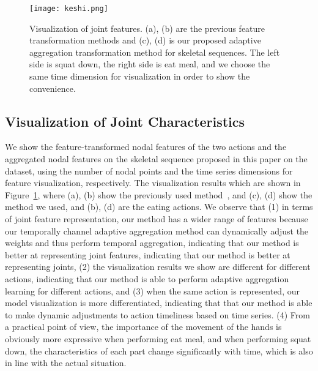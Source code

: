 \documentclass[letterpaper]{article} \usepackage[submission]{aaai23}  \usepackage{times}  \usepackage{helvet}  \usepackage{courier}  \usepackage[hyphens]{url}  \usepackage{graphicx} \urlstyle{rm} \def\UrlFont{\rm}  \usepackage{natbib}  \usepackage{caption} \frenchspacing  \setlength{\pdfpagewidth}{8.5in} \setlength{\pdfpageheight}{11in} \usepackage{algorithm}
\begin{document}
\begin{figure}[htp]
    \centering
    \texttt{[image: keshi.png]}
    \caption{Visualization of joint features. (a), (b) are the previous feature transformation methods and (c), (d) is our proposed adaptive aggregation transformation method for skeletal sequences. The left side is squat down, the right side is eat meal, and we choose the same time dimension for visualization in order to show the convenience.}
    \label{fig:galaxy66}
\end{figure}

\subsection{Visualization of Joint Characteristics}
We show the feature-transformed nodal features of the two actions and the aggregated nodal features on the skeletal sequence proposed in this paper on the dataset, using the number of nodal points and the time series dimensions for feature visualization, respectively. The visualization results which are shown in Figure~\ref{fig:galaxy66}, where (a), (b) show the previously used method~\cite{2021Channel}, and (c), (d) show the method we used, and (b), (d) are the eating actions. We observe that (1) in terms of joint feature representation, our method has a wider range of features because our temporally channel adaptive aggregation method can dynamically adjust the weights and thus perform temporal aggregation, indicating that our method is better at representing joint features, indicating that our method is better at representing joints, (2) the visualization results we show are different for different actions, indicating that our method is able to perform adaptive aggregation learning for different actions, and (3) when the same action is represented, our model visualization is more differentiated, indicating that that our method is able to make dynamic adjustments to action timeliness based on time series. (4) From a practical point of view, the importance of the movement of the hands is obviously more expressive when performing eat meal, and when performing squat down, the characteristics of each part change significantly with time, which is also in line with the actual situation.
\end{document}
